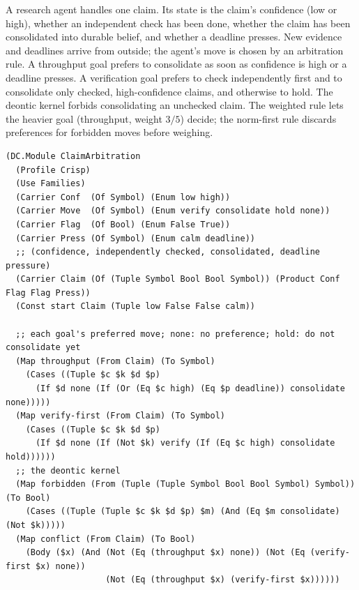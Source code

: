 \documentclass[11pt]{article}
\theoremstyle{definition}
\theoremstyle{plain}
\begin{document}
A research agent handles one claim. Its state is the claim's confidence (low or high), whether an
independent check has been done, whether the claim has been consolidated into durable belief, and
whether a deadline presses. New evidence and deadlines arrive from outside; the agent's move is
chosen by an arbitration rule. A throughput goal prefers to consolidate as soon as confidence is
high or a deadline presses. A verification goal prefers to check independently first and to
consolidate only checked, high-confidence claims, and otherwise to hold. The deontic kernel forbids
consolidating an unchecked claim. The weighted rule lets the heavier goal (throughput, weight $3/5$)
decide; the norm-first rule discards preferences for forbidden moves before weighing.
\begin{lstlisting}[style=mettamod]
(DC.Module ClaimArbitration
  (Profile Crisp)
  (Use Families)
  (Carrier Conf  (Of Symbol) (Enum low high))
  (Carrier Move  (Of Symbol) (Enum verify consolidate hold none))
  (Carrier Flag  (Of Bool) (Enum False True))
  (Carrier Press (Of Symbol) (Enum calm deadline))
  ;; (confidence, independently checked, consolidated, deadline pressure)
  (Carrier Claim (Of (Tuple Symbol Bool Bool Symbol)) (Product Conf Flag Flag Press))
  (Const start Claim (Tuple low False False calm))

  ;; each goal's preferred move; none: no preference; hold: do not consolidate yet
  (Map throughput (From Claim) (To Symbol)
    (Cases ((Tuple $c $k $d $p)
      (If $d none (If (Or (Eq $c high) (Eq $p deadline)) consolidate none)))))
  (Map verify-first (From Claim) (To Symbol)
    (Cases ((Tuple $c $k $d $p)
      (If $d none (If (Not $k) verify (If (Eq $c high) consolidate hold))))))
  ;; the deontic kernel
  (Map forbidden (From (Tuple (Tuple Symbol Bool Bool Symbol) Symbol)) (To Bool)
    (Cases ((Tuple (Tuple $c $k $d $p) $m) (And (Eq $m consolidate) (Not $k)))))
  (Map conflict (From Claim) (To Bool)
    (Body ($x) (And (Not (Eq (throughput $x) none)) (Not (Eq (verify-first $x) none))
                    (Not (Eq (throughput $x) (verify-first $x))))))


\end{lstlisting}
\end{document}
